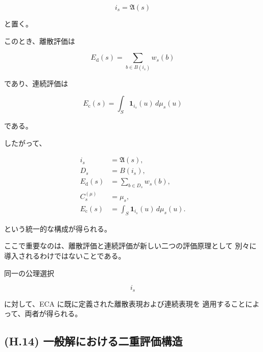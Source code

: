 \documentclass[a4paper,11pt]{article}
\begin{document}
\begin{equation}
    i_s=\mathfrak{A}(s)
\end{equation}

と置く。

このとき、離散評価は

\begin{equation}
    E_{\mathrm d}(s)
    =
    \sum_{b\in B(i_s)}w_s(b)
\end{equation}

であり、連続評価は

\begin{equation}
    E_{\mathrm c}(s)
    =
    \int_S
    \mathbf1_{i_s}(u)\,d\mu_s(u)
\end{equation}

である。

したがって、

\begin{equation}
    \boxed{
    \begin{aligned}
        i_s
        &=
        \mathfrak{A}(s),
        \\[1mm]
        D_s
        &=
        B(i_s),
        \\[1mm]
        E_{\mathrm d}(s)
        &=
        \sum_{b\in D_s}w_s(b),
        \\[1mm]
        C_s^{(\mu)}
        &=
        \mu_s,
        \\[1mm]
        E_{\mathrm c}(s)
        &=
        \int_S
        \mathbf1_{i_s}(u)\,d\mu_s(u).
    \end{aligned}
    }
    \label{eq:H-unified-evaluation}
\end{equation}

という統一的な構成が得られる。

ここで重要なのは、離散評価と連続評価が新しい二つの評価原理として
別々に導入されるわけではないことである。

同一の公理選択

\begin{equation}
    i_s
\end{equation}

に対して、ECA に既に定義された離散表現および連続表現を
適用することによって、両者が得られる。


\subsection{(H.14) 一般解における二重評価構造}
\label{subsec:H14}
\end{document}
